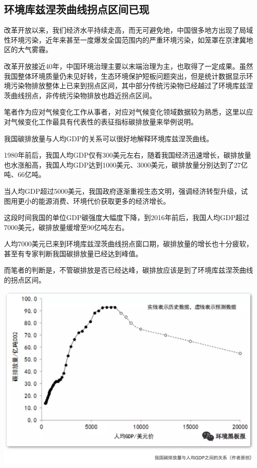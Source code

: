 \documentclass[]{book}
\begin{document}
\subsection{环境库兹涅茨曲线拐点区间已现}

改革开放以来，我们经济水平持续走高，而无可避免地，中国很多地方出现了局域性环境污染，近年来甚至一度爆发全国范围内的严重环境污染，如笼罩在京津冀地区的大气雾霾。

改革开放接近40年，中国环境治理主要以末端治理为主，也取得了一定成果。虽然我国整体环境质量仍未见好转，生态环境保护短板问题突出，但是统计数据显示环境污染物排放整体上已来到拐点区间，其中部分传统污染物已经越过了环境库兹涅茨曲线拐点，非传统污染物排放也趋近拐点区间。

笔者作为应对气候变化工作从事者，对应对气候变化领域数据较为熟悉，这里以应对气候变化工作最具有代表性的表征指标碳排放量来举例说明。

我国碳排放量与人均GDP的关系可以很好地解释环境库兹涅茨曲线。

1980年前后，我国人均GDP仅有300美元左右，随着我国经济迅速增长，碳排放量也水涨船高，我国人均GDP达到1000美元、3000美元，碳排放量分别达到了27亿吨、66亿吨。

当人均GDP超过5000美元，我国政府逐渐重视生态文明，强调经济转型升级，试图用更小的能源消费、环境代价获取更多的经济增长。

这段时间我国的单位GDP碳强度大幅度下降，到2016年前后，我国人均GDP超过7000美元，碳排放量缓增至90亿吨左右。

人均7000美元已来到环境库兹涅茨曲线拐点窗口期，碳排放量的增长也十分疲软，甚至有专家判断我国碳排放量已经达到峰值。

而笔者的判断是，不管碳排放是否已经达峰，碳排放应该是到了环境库兹涅茨曲线的拐点区间。

\includegraphics[width=8.33in]{images/huanjing2}
\end{document}
